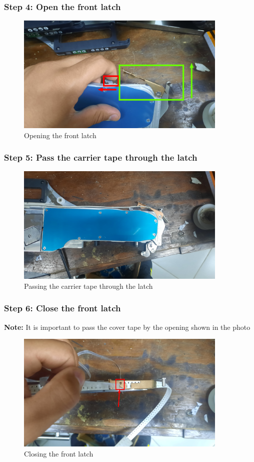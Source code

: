 \documentclass[a4paper,10pt]{report}
\begin{document}
\subsubsection{Step 4: Open the front latch}
\begin{figure}[!htb]
 \centering
 \includegraphics[width=0.9\textwidth]{step4.png}
 \caption{Opening the front latch}
\end{figure}
\subsubsection{Step 5: Pass the carrier tape through the latch}
\begin{figure}[!htb]
 \centering
 \includegraphics[width=0.9\textwidth]{step5.jpg}
 \caption{Passing the carrier tape through the latch}
\end{figure}
\newpage
\subsubsection{Step 6: Close the front latch}
\textbf{Note: } It is important to pass the cover tape by the opening shown in the photo
\begin{figure}[!htb]
 \centering
 \includegraphics[width=0.9\textwidth]{step6.png}
 \caption{Closing the front latch}
\end{figure}
\newpage
\end{document}
